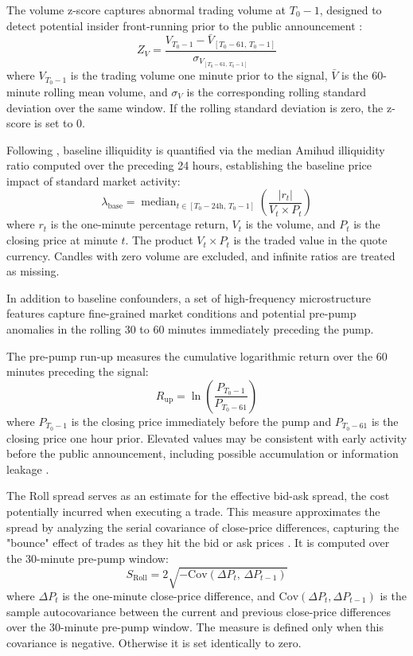 The volume z-score captures abnormal trading volume at $T_0 - 1$, designed to detect potential insider front-running prior to the public announcement \cite{lamorgia2020pump}:
\begin{equation}
    \label{eq:vol_z_score}
    Z_V = \frac{V_{T_0-1} - \bar{V}_{[T_0-61,\, T_0-1]}}{\sigma_{V_{[T_0-61,\, T_0-1]}}}
\end{equation}
where $V_{T_0-1}$ is the trading volume one minute prior to the signal, $\bar{V}$ is the 60-minute rolling mean volume, and $\sigma_V$ is the corresponding rolling standard deviation over the same window. If the rolling standard deviation is zero, the z-score is set to 0.

Following , baseline illiquidity is quantified via the median Amihud illiquidity ratio computed over the preceding 24 hours, establishing the baseline price impact of standard market activity:
\begin{equation}
    \label{eq:baseline_illiq}
    \lambda_{\text{base}} = \operatorname{median}_{t \in [T_0-24\text{h},\, T_0-1]} \left( \frac{|r_t|}{V_t \times P_t} \right)
\end{equation}
where $r_t$ is the one-minute percentage return, $V_t$ is the volume, and $P_t$ is the closing price at minute $t$. The product $V_t \times P_t$ is the traded value in the quote currency. Candles with zero volume are excluded, and infinite ratios are treated as missing.

In addition to baseline confounders, a set of high-frequency microstructure features capture fine-grained market conditions and potential pre-pump anomalies in the rolling 30 to 60 minutes immediately preceding the pump.

The pre-pump run-up measures the cumulative logarithmic return over the 60 minutes preceding the signal:
\begin{equation}
    \label{eq:pre_run_up}
    R_{\text{up}} = \ln \left( \frac{P_{T_0-1}}{P_{T_0-61}} \right)
\end{equation}
where $P_{T_0-1}$ is the closing price immediately before the pump and $P_{T_0-61}$ is the closing price one hour prior. Elevated values may be consistent with early activity before the public announcement, including possible accumulation or information leakage \cite{lamorgia2020pump}.

The Roll spread serves as an estimate for the effective bid-ask spread, the cost potentially incurred when executing a trade. This measure approximates the spread by analyzing the serial covariance of close-price differences, capturing the "bounce" effect of trades as they hit the bid or ask prices \cite{roll1984simple}. It is computed over the 30-minute pre-pump window:
\begin{equation}
    \label{eq:roll_spread}
    S_{\text{Roll}} = 2\sqrt{-\mathrm{Cov}(\Delta P_t,\, \Delta P_{t-1})}
\end{equation}
where $\Delta P_t$ is the one-minute close-price difference, and $\mathrm{Cov}(\Delta P_t, \Delta P_{t-1})$ is the sample autocovariance between the current and previous close-price differences over the 30-minute pre-pump window. The measure is defined only when this covariance is negative. Otherwise it is set identically to zero.

